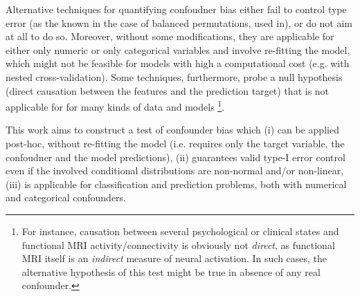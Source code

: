 \documentclass{article}
\begin{document}
Alternative techniques for quantifying confoudner bias either fail to control type error (as  the known in the case of balanced permutations\cite{southworth2009properties, hemerik2018exact}, used in\cite{chaibub2019permutation}), or do not aim at all to do so\cite{ferrari2020measuring, wachinger2021detect}. 
Moreover, without some modifications, they are applicable for either only numeric\cite{wachinger2021detect} or only categorical variables\citep{chaibub2019permutation, ferrari2020measuring} and involve re-fitting the model\citep{chaibub2019permutation, ferrari2020measuring}, which might not be feasible for models with high a computational cost (e.g. with nested cross-validation). Some techniques\cite{wachinger2021detect}, furthermore, probe a null hypothesis (direct causation between the features and the prediction target) that is not applicable for for many kinds of data and models \footnote{For instance, causation between several psychological or clinical states and functional MRI activity/connectivity is obviously not \emph{direct}, as functional MRI itself is an \emph{indirect} measure of neural activation. In such cases, the alternative hypothesis of this test might be true in absence of any real confounder. }.

This work aims to construct a test of confounder bias which (i) can be applied post-hoc, without re-fitting the model (i.e. requires only the target variable, the confoudner and the model predictions), (ii) guarantees valid type-I error control even if the involved conditional distributions are non-normal and/or non-linear, (iii) is applicable for classification and prediction problems, both with numerical and categorical confounders.


\end{document}
